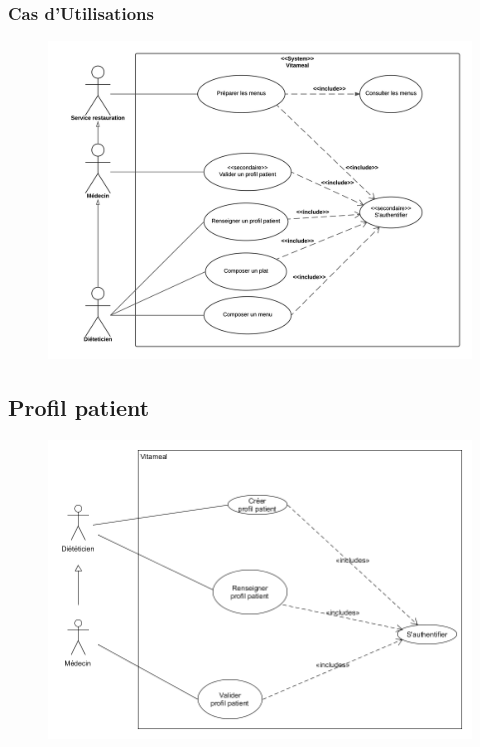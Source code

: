 \documentclass{beamer}
\begin{document}
\begin{frame}
\frametitle{Cas d'Utilisations}
\begin{figure}[H]
\label{schema}
  \centering
      \includegraphics[scale=0.4]{../CasDUtilisations/diagramme_cas_utilisation.png}
\end{figure}
\end{frame}

\subsection{Profil patient}
\begin{frame}[plain]{}
%
\begin{figure}
\centering
\includegraphics[scale=0.4]{../CasDUtilisations/ProfilPatient/UseCaseProfilPatient.png}
\end{figure}
\end{frame}
\end{document}
